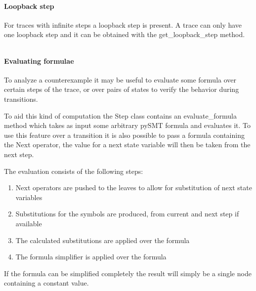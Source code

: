 \paragraph*{Loopback step}
For traces with infinite steps a loopback step is present. A trace can only have one loopback step and it can be obtained with the get\_loopback\_step method.

\inputminted[firstline=57, lastline=59]{python3}{py/model_checking.py}

\paragraph*{Evaluating formulae}
To analyze a counterexample it may be useful to evaluate some formula over certain steps of the trace, or over pairs of states to verify the behavior during transitions.

To aid this kind of computation the Step class contains an evaluate\_formula method which takes as input some arbitrary pySMT formula and evaluates it.
To use this feature over a transition it is also possible to pass a formula containing the Next operator, the value for a next state variable will then be taken from the next step.

The evaluation consists of the following steps:
\begin{enumerate}
    \item Next operators are pushed to the leaves to allow for substitution of next state variables
    \item Substitutions for the symbols are produced, from current and next step if available
    \item The calculated substitutions are applied over the formula
    \item The formula simplifier is applied over the formula
\end{enumerate}

If the formula can be simplified completely the result will simply be a single node containing a constant value.

\inputminted[firstline=7]{python3}{py/formula_evaluation.py}

